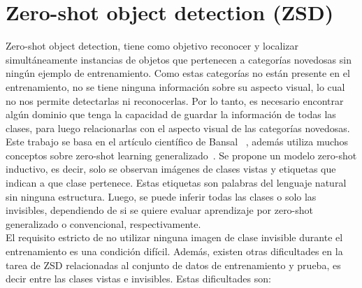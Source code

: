 \section {Zero-shot object detection (ZSD)} \label{sec:zeroshotobjectdetection}
Zero-shot object detection, tiene como objetivo reconocer y localizar simultáneamente instancias de objetos que pertenecen a categorías novedosas sin ningún ejemplo de entrenamiento. Como estas categorías no están presente en el entrenamiento, no se tiene ninguna información sobre su aspecto visual, lo cual no nos permite detectarlas ni reconocerlas. Por lo tanto, es necesario encontrar algún dominio que tenga la capacidad de guardar la información de todas las clases, para luego relacionarlas con el aspecto visual de las categorías novedosas.\\

Este trabajo se basa en el artículo científico de Bansal \etal ~\cite{bansal2018zero}, además utiliza muchos conceptos sobre zero-shot learning generalizado~\cite{zero-shot-generalizado}. Se propone un modelo zero-shot  inductivo, es decir, solo se observan imágenes de clases vistas y etiquetas que indican a que clase pertenece. Estas etiquetas son palabras del lenguaje natural sin ninguna estructura. Luego, se puede inferir todas las clases o solo las invisibles, dependiendo de si se quiere evaluar aprendizaje por zero-shot  generalizado o convencional, respectivamente.\\ 

El requisito estricto de no utilizar ninguna imagen de clase invisible durante el entrenamiento es una condición difícil. Además, existen otras dificultades en la tarea de ZSD relacionadas al conjunto de datos de entrenamiento y prueba, es decir entre las clases vistas e invisibles. Estas dificultades son:

